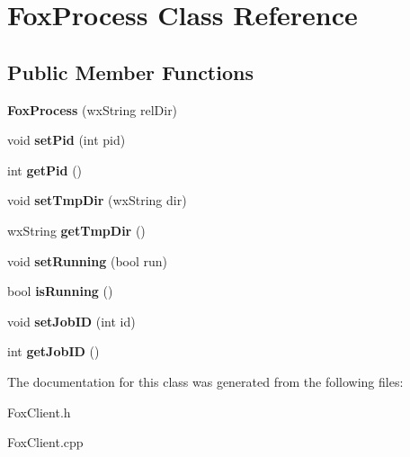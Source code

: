 \hypertarget{class_fox_process}{}\section{Fox\+Process Class Reference}
\label{class_fox_process}
\subsection*{Public Member Functions}
\begin{DoxyCompactItemize}
\item 
\mbox{\label{class_fox_process_a9567d535830f5ecbb13d2157c99936df}} 
{\bfseries Fox\+Process} (wx\+String rel\+Dir)
\item 
\mbox{\label{class_fox_process_a7a7627e92524bd3cef14f287df6e8da6}} 
void {\bfseries set\+Pid} (int pid)
\item 
\mbox{\label{class_fox_process_a54810fa1832e6acb1d64bcbf66a90040}} 
int {\bfseries get\+Pid} ()
\item 
\mbox{\label{class_fox_process_a55bbfa1361fd3a455fb462f060e19213}} 
void {\bfseries set\+Tmp\+Dir} (wx\+String dir)
\item 
\mbox{\label{class_fox_process_a41ae7c444fe9a58b2af007e83b120fe1}} 
wx\+String {\bfseries get\+Tmp\+Dir} ()
\item 
\mbox{\label{class_fox_process_a4bc83421e95adc47808b57d0c01c7139}} 
void {\bfseries set\+Running} (bool run)
\item 
\mbox{\label{class_fox_process_a5d94d30cb3d499297207e68328adfc8f}} 
bool {\bfseries is\+Running} ()
\item 
\mbox{\label{class_fox_process_a00bb566b18b235aeca713818a79f0e2d}} 
void {\bfseries set\+Job\+ID} (int id)
\item 
\mbox{\label{class_fox_process_a7466d68a3d669b6d3b09157b17e020f4}} 
int {\bfseries get\+Job\+ID} ()
\end{DoxyCompactItemize}


The documentation for this class was generated from the following files\+:\begin{DoxyCompactItemize}
\item 
Fox\+Client.\+h\item 
Fox\+Client.\+cpp\end{DoxyCompactItemize}
